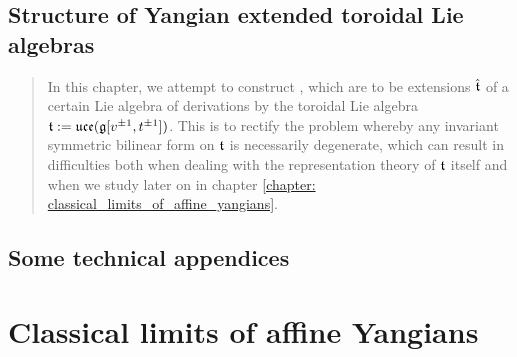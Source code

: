             \minitoc
        
           
    
           

           
    
        \newpage
    
        \chapter{Structure of Yangian extended toroidal Lie algebras} \label{chapter: yangian_EALAs}
            \begin{abstract}
                In this chapter, we attempt to construct , which are to be extensions $\hat{\mathfrak{t}}$ of a certain Lie algebra of derivations by the toroidal Lie algebra $\mathfrak{t} := \mathfrak{uce}(\mathfrak{g}[v^{\pm 1}, t^{\pm 1}])$. This is to rectify the problem whereby any invariant symmetric bilinear form on $\mathfrak{t}$ is necessarily degenerate, which can result in difficulties both when dealing with the representation theory of $\mathfrak{t}$ itself and when we study  later on in chapter \ref{chapter: classical_limits_of_affine_yangians}.
            \end{abstract}
    
            \minitoc
        
            
    
            

            
    
            
    
        \newpage

    \begin{appendices}
        \chapter{Some technical appendices}
            
    \end{appendices}

    \newpage

    \part{Classical limits of affine Yangians} 
